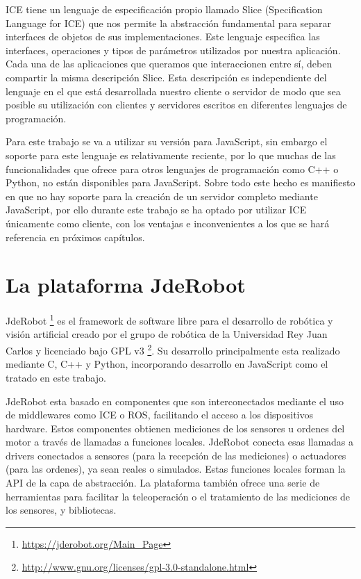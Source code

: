 ICE tiene un lenguaje de especificación propio llamado Slice (Specification Language for ICE) que nos permite la abstracción fundamental para separar interfaces de objetos de sus implementaciones. Este lenguaje especifica las interfaces, operaciones y tipos de parámetros utilizados por nuestra aplicación. Cada una de las aplicaciones que queramos que interaccionen entre sí, deben compartir la misma descripción Slice. Esta descripción es independiente del lenguaje en el que está desarrollada nuestro cliente o servidor de modo que sea posible su utilización con clientes y servidores escritos en diferentes lenguajes de programación.

Para este trabajo se va a utilizar su versión para JavaScript, sin embargo el soporte para este lenguaje es relativamente reciente, por lo que muchas de las funcionalidades que ofrece para otros lenguajes de programación como C++ o Python, no están disponibles para JavaScript. Sobre todo este hecho es manifiesto en que no hay soporte para la creación de un servidor completo mediante JavaScript, por ello durante este trabajo se ha optado por utilizar ICE únicamente como cliente, con los ventajas e inconvenientes a los que se hará referencia en próximos capítulos.

\section{La plataforma JdeRobot}
JdeRobot \footnote{\url{https://jderobot.org/Main_Page}} es el framework de software libre para el desarrollo de robótica y visión artificial creado por el grupo de robótica de la Universidad Rey Juan Carlos y licenciado bajo GPL v3 \footnote{\url{http://www.gnu.org/licenses/gpl-3.0-standalone.html}}. Su desarrollo principalmente esta realizado mediante C, C++ y Python, incorporando desarrollo en JavaScript como el tratado en este trabajo.

JdeRobot esta basado en componentes que son interconectados mediante el uso de middlewares como ICE o ROS, facilitando el acceso a los dispositivos hardware. Estos componentes obtienen mediciones  de los sensores u ordenes del motor a través de llamadas a funciones locales. JdeRobot conecta esas llamadas a drivers conectados a sensores (para la recepción de las mediciones) o actuadores (para las ordenes), ya sean reales o simulados. Estas funciones locales forman la API de la capa de abstracción. La plataforma también ofrece una serie de herramientas para facilitar la teleoperación o el tratamiento de las mediciones de los sensores, y bibliotecas.
